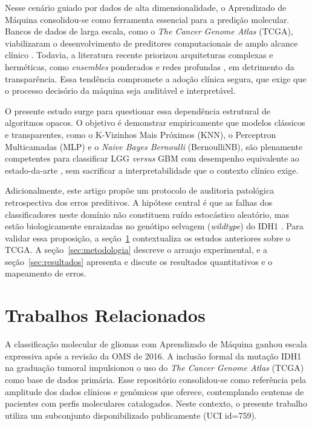 \documentclass[12pt]{article}
\begin{document}
Nesse cenário guiado por dados de alta dimensionalidade, o Aprendizado de Máquina consolidou-se como ferramenta essencial para a predição molecular. Bancos de dados de larga escala, como o \textit{The Cancer Genome Atlas} (TCGA), viabilizaram o desenvolvimento de preditores computacionais de amplo alcance clínico \cite{tasci2022, munquad2022}. Todavia, a literatura recente priorizou arquiteturas complexas e herméticas, como \textit{ensembles} ponderados \cite{joshi2021} e redes profundas \cite{zheng2024}, em detrimento da transparência. Essa tendência compromete a adoção clínica segura, que exige que o processo decisório da máquina seja auditável e interpretável.

O presente estudo surge para questionar essa dependência estrutural de algoritmos opacos. O objetivo é demonstrar empiricamente que modelos clássicos e transparentes, como o K-Vizinhos Mais Próximos (KNN), o Perceptron Multicamadas (MLP) e o \textit{Naive Bayes Bernoulli} (BernoulliNB), são plenamente competentes para classificar LGG \textit{versus} GBM com desempenho equivalente ao estado-da-arte \cite{sanchezmarques2024}, sem sacrificar a interpretabilidade que o contexto clínico exige.

Adicionalmente, este artigo propõe um protocolo de auditoria patológica retrospectiva dos erros preditivos. A hipótese central é que as falhas dos classificadores neste domínio não constituem ruído estocástico aleatório, mas estão biologicamente enraizadas no genótipo selvagem (\textit{wildtype}) do IDH1 \cite{sanchezmarques2026}. Para validar essa proposição, a seção~\ref{sec:trabalhos_relacionados} contextualiza os estudos anteriores sobre o TCGA. A seção~\ref{sec:metodologia} descreve o arranjo experimental, e a seção~\ref{sec:resultados} apresenta e discute os resultados quantitativos e o mapeamento de erros.

\section{Trabalhos Relacionados}
\label{sec:trabalhos_relacionados}

A classificação molecular de gliomas com Aprendizado de Máquina ganhou escala expressiva após a revisão da OMS de 2016. A inclusão formal da mutação IDH1 na graduação tumoral impulsionou o uso do \textit{The Cancer Genome Atlas} (TCGA) como base de dados primária. Esse repositório consolidou-se como referência pela amplitude dos dados clínicos e genômicos que oferece, contemplando centenas de pacientes com perfis moleculares catalogados. Neste contexto, o presente trabalho utiliza um subconjunto disponibilizado publicamente (UCI id=759).
\end{document}
